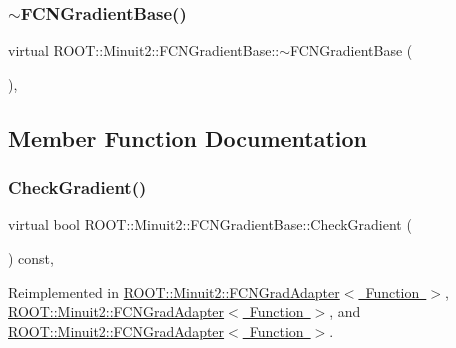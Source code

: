 \subsubsection{\texorpdfstring{$\sim$FCNGradientBase()}{~FCNGradientBase()}\hspace{0.1cm}{\footnotesize\ttfamily [3/3]}}
{\footnotesize\ttfamily virtual R\+O\+O\+T\+::\+Minuit2\+::\+F\+C\+N\+Gradient\+Base\+::$\sim$\+F\+C\+N\+Gradient\+Base (\begin{DoxyParamCaption}{ }\end{DoxyParamCaption})\hspace{0.3cm}{\ttfamily [inline]}, {\ttfamily [virtual]}}



\subsection{Member Function Documentation}
\mbox{\label{classROOT_1_1Minuit2_1_1FCNGradientBase_ae69375c7506f0be6a1ab4e4e937ac555}} 
\subsubsection{\texorpdfstring{CheckGradient()}{CheckGradient()}\hspace{0.1cm}{\footnotesize\ttfamily [1/3]}}
{\footnotesize\ttfamily virtual bool R\+O\+O\+T\+::\+Minuit2\+::\+F\+C\+N\+Gradient\+Base\+::\+Check\+Gradient (\begin{DoxyParamCaption}{ }\end{DoxyParamCaption}) const\hspace{0.3cm}{\ttfamily [inline]}, {\ttfamily [virtual]}}



Reimplemented in \mbox{\hyperlink{classROOT_1_1Minuit2_1_1FCNGradAdapter_a10faf0c868284a440f291465b7efd08e}{R\+O\+O\+T\+::\+Minuit2\+::\+F\+C\+N\+Grad\+Adapter$<$ Function $>$}}, \mbox{\hyperlink{classROOT_1_1Minuit2_1_1FCNGradAdapter_a10faf0c868284a440f291465b7efd08e}{R\+O\+O\+T\+::\+Minuit2\+::\+F\+C\+N\+Grad\+Adapter$<$ Function $>$}}, and \mbox{\hyperlink{classROOT_1_1Minuit2_1_1FCNGradAdapter_a10faf0c868284a440f291465b7efd08e}{R\+O\+O\+T\+::\+Minuit2\+::\+F\+C\+N\+Grad\+Adapter$<$ Function $>$}}.


